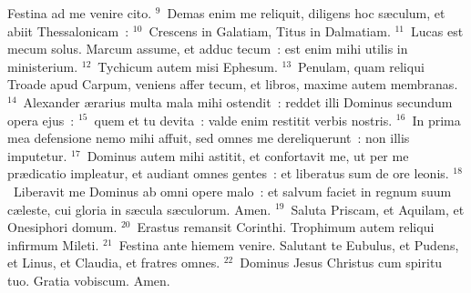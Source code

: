  Festina ad me venire cito.
${}^{9}$~Demas enim me reliquit, diligens hoc s\ae culum, et abiit Thessalonicam~:
${}^{10}$~Crescens in Galatiam, Titus in Dalmatiam.
${}^{11}$~Lucas est mecum solus. Marcum assume, et adduc tecum~: est enim mihi utilis in ministerium.
${}^{12}$~Tychicum autem misi Ephesum.
${}^{13}$~Penulam, quam reliqui Troade apud Carpum, veniens affer tecum, et libros, maxime autem membranas.
${}^{14}$~Alexander \ae rarius multa mala mihi ostendit~: reddet illi Dominus secundum opera ejus~:
${}^{15}$~quem et tu devita~: valde enim restitit verbis nostris.
${}^{16}$~In prima mea defensione nemo mihi affuit, sed omnes me dereliquerunt~: non illis imputetur.
${}^{17}$~Dominus autem mihi astitit, et confortavit me, ut per me pr\ae dicatio impleatur, et audiant omnes gentes~: et liberatus sum de ore leonis.
${}^{18}$~Liberavit me Dominus ab omni opere malo~: et salvum faciet in regnum suum c\ae leste, cui gloria in s\ae cula s\ae culorum. Amen.
${}^{19}$~Saluta Priscam, et Aquilam, et Onesiphori domum.
${}^{20}$~Erastus remansit Corinthi. Trophimum autem reliqui infirmum Mileti.
${}^{21}$~Festina ante hiemem venire. Salutant te Eubulus, et Pudens, et Linus, et Claudia, et fratres omnes.
${}^{22}$~Dominus Jesus Christus cum spiritu tuo. Gratia vobiscum. Amen.
